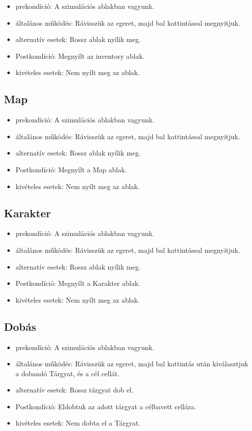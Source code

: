 \begin{itemize}
    \item prekondíció: A szimulációs ablakban vagyunk.
    \item általános működés: Rávisszük az egeret, majd bal kattintással megnyitjuk.
    \item alternatív esetek: Rossz ablak nyílik meg.
    \item Postkondíció: Megnyílt az inventory ablak.
    \item kivételes esetek: Nem nyílt meg az ablak.
\end{itemize}

\subsection{Map}

\begin{itemize}
    \item prekondíció: A szimulációs ablakban vagyunk.
    \item általános működés: Rávisszük az egeret, majd bal kattintással megnyitjuk.
    \item alternatív esetek: Rossz ablak nyílik meg.
    \item Postkondíció: Megnyílt a Map ablak.
    \item kivételes esetek: Nem nyílt meg az ablak.
\end{itemize}

\subsection{Karakter}

\begin{itemize}
    \item prekondíció: A szimulációs ablakban vagyunk.
    \item általános működés: Rávisszük az egeret, majd bal kattintással megnyitjuk.
    \item alternatív esetek: Rossz ablak nyílik meg.
    \item Postkondíció: Megnyílt a Karakter ablak.
    \item kivételes esetek: Nem nyílt meg az ablak.
\end{itemize}

\subsection{Dobás}

\begin{itemize}
    \item prekondíció: A szimulációs ablakban vagyunk.
    \item általános működés: Rávisszük az egeret, majd bal kattintás után kiválasztjuk a dobandó Tárgyat, és a cél cellát.
    \item alternatív esetek: Rossz tárgyat dob el.
    \item Postkondíció: Eldobtuk az adott tárgyat a célbavett cellára.
    \item kivételes esetek: Nem dobta el a Tárgyat.
\end{itemize}

